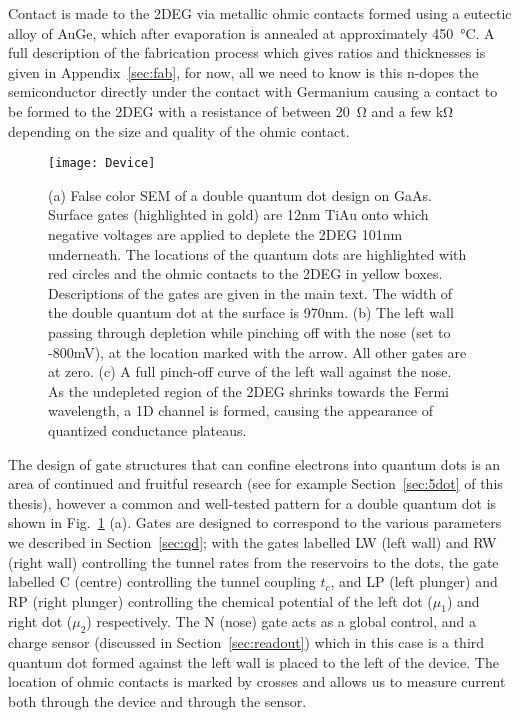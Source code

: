Contact is made to the 2DEG via metallic ohmic contacts formed using a eutectic alloy of AuGe, which after evaporation is annealed
at approximately \SI{450}{\celsius}. A full description of the fabrication process which gives ratios and thicknesses is given
in Appendix~\ref{sec:fab}, for now, all we need to know is this n-dopes the semiconductor directly under the contact with Germanium
causing a contact to be formed to the 2DEG with a resistance of between \SI{20}{\ohm} and a few \si{\kilo\ohm} depending on the size and quality
of the ohmic contact.

\begin{figure}
  \texttt{[image: Device]}
  \caption[SEM image of a double quantum dot on GaAs]
  {\label{fig:dd_design}(a) False color SEM of a double quantum dot design on GaAs. Surface gates (highlighted in gold) are
  12nm TiAu onto which negative voltages are applied to deplete the 2DEG 101nm underneath. The locations of the quantum dots are
  highlighted with red circles and the ohmic contacts to the 2DEG in yellow boxes. Descriptions of the gates are given in the
  main text. The width of the double quantum dot at the surface is 970nm. (b) The left wall passing through depletion while
  pinching off with the nose (set to -800mV), at the location marked with the arrow. All other gates are at zero. (c)
  A full pinch-off curve of the left wall against the nose. As the undepleted region of the 2DEG shrinks towards the Fermi
  wavelength, a 1D channel is formed, causing the appearance of quantized conductance plateaus.}
\end{figure}

The design of gate structures that can confine electrons into quantum dots is an area of continued and fruitful research (see for
example Section~\ref{sec:5dot} of this thesis), however a common and well-tested pattern for a double quantum dot is shown in Fig.~\ref{fig:dd_design} (a).
Gates are designed to correspond to the various parameters we described in Section~\ref{sec:qd}; with the gates labelled LW (left wall)
and RW (right wall) controlling the tunnel rates from the reservoirs to the dots, the gate labelled C (centre) controlling the tunnel coupling
$t_c$, and LP (left plunger) and RP (right plunger) controlling the chemical potential of the left dot ($\mu_1$) and right dot ($\mu_2$) respectively.
The N (nose) gate acts as a global control, and a charge sensor (discussed in Section~\ref{sec:readout}) which in this case is a third quantum dot formed
against the left wall is placed to the left of the device. The location of ohmic contacts is marked by crosses and allows us to measure current both
through the device and through the sensor.

